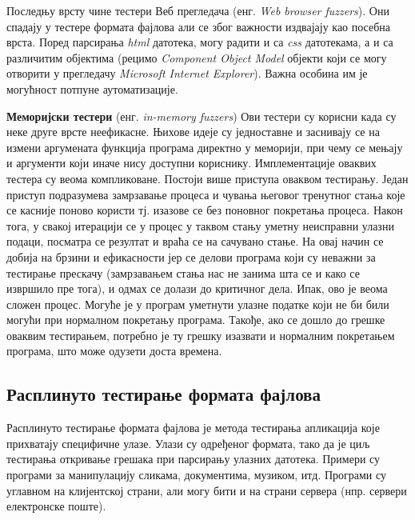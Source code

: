 \documentclass[12pt,oneside]{memoir}
\begin{document}
\begin{description}
Последњу врсту чине тестери Веб прегледача (енг. \textit{Web browser fuzzers}). Они спадају у тестере формата фајлова али се због важности издвајају као посебна врста. Поред парсирања \textit{html} датотека, могу радити и са \textit{css} датотекама, а и са различитим објектима (рецимо \textit{Component Object Model} објекти који се могу отворити у прегледачу \textit{Microsoft Internet Explorer}). Важна особина им је могућност потпуне аутоматизације.
\item \textbf{Меморијски тестери} (енг. \textit{in-memory fuzzers}) Ови тестери су корисни када су неке друге врсте неефикасне. Њихове идеје су једноставне и заснивају се на измени аргумената функција програма директно у меморији, при чему се мењају и аргументи који иначе нису доступни кориснику. Имплементације оваквих тестера су веома компликоване. Постоји више приступа оваквом тестирању. Један приступ подразумева замрзавање процеса и чувања његовог тренутног стања које се касније поново користи тј. изазове се без поновног покретања процеса. Након тога, у свакој итерацији се у процес у таквом стању уметну неисправни улазни подаци, посматра се резултат и враћа се на сачувано стање. На овај начин се добија на брзини и ефикасности јер се делови програма који су неважни за тестирање прескачу (замрзавањем стања нас не занима шта се и како се извршило пре тога), и одмах се долази до критичног дела. Ипак, ово је веома сложен процес. Могуће је у програм уметнути улазне податке који не би били могући при нормалном покретању програма. Такође, ако се дошло до грешке оваквим тестирањем, потребно је ту грешку изазвати и нормалним покретањем програма, што може одузети доста времена.
\end{description}

\subsection{Расплинуто тестирање формата фајлова}
\label{subsec:rasTestFormFajl}

Расплинуто тестирање формата фајлова  је метода тестирања апликација које прихватају специфичне улазе. Улази су одређеног формата, тако да је циљ тестирања откривање грешака при парсирању улазних датотека. Примери су програми за манипулацију сликама, документима, музиком, итд. Програми су углавном на клијентској страни, али могу бити и на страни сервера (нпр. сервери електронске поште).
\end{document}
